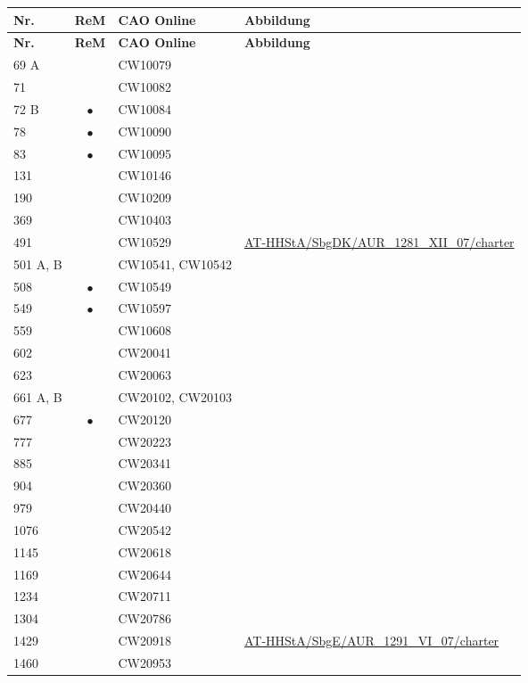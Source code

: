 \begin{xltabular}{\linewidth}{@{} l c l X @{}}
\toprule
\textbf{Nr.}
	& \textbf{ReM}
	& \textbf{CAO Online}
	& \textbf{Abbildung}
	\\
\midrule
\endfirsthead

\textbf{Nr.}
	& \textbf{ReM}
	& \textbf{CAO Online}
	& \textbf{Abbildung}
	\\
\midrule
\endhead

\bottomrule
\endlastfoot

69 A	&           & CW10079 \\
71		&           & CW10082 \\
72 B	& $\bullet$ & CW10084 \\
78		& $\bullet$ & CW10090 \\
83		& $\bullet$ & CW10095 \\
131		&           & CW10146 \\
190		&           & CW10209 \\
369		&           & CW10403 \\
491		&           & CW10529
		& \url{AT-HHStA/SbgDK/AUR_1281_XII_07/charter}
	\\
501 A, B	&           & CW10541, CW10542 \\
508		& $\bullet$ & CW10549 \\
549		& $\bullet$ & CW10597 \\
559		&           & CW10608 \\
602		&           & CW20041 \\
623		&           & CW20063 \\
661 A, B	&           & CW20102, CW20103 \\
677		& $\bullet$ & CW20120 \\
777		&           & CW20223 \\
885		&           & CW20341 \\
904		&           & CW20360 \\
979		&           & CW20440 \\
1076	&           & CW20542 \\
1145	&           & CW20618 \\
1169	&           & CW20644 \\
1234	&           & CW20711 \\
1304	&           & CW20786 \\
1429	&           & CW20918
		& \url{AT-HHStA/SbgE/AUR_1291_VI_07/charter}
	\\
1460	&           & CW20953 \\

\end{xltabular}

